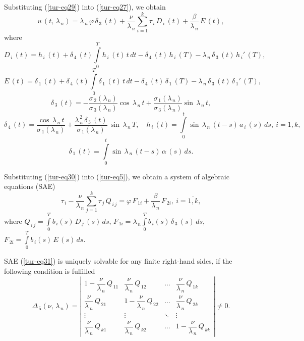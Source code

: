 ﻿\documentclass[
11pt,%
tightenlines,%
twoside,%
onecolumn,%
nofloats,%
nobibnotes,%
nofootinbib,%
superscriptaddress,%
noshowpacs,%
centertags]%
{revtex4}
\begin{document}
 Substituting (\ref{tur-eq29}) into (\ref{tur-eq27}), we obtain
\begin{equation} \label{tur-eq30}	
u \, (t , \, \lambda_{\, n})=\lambda_{\, n}  \, \varphi \, \delta_{\, 3} \, (t)+\dfrac{\nu}{\lambda_{\, n}} \sum \limits_{i=1}^{k} \tau_{\, i} \, D_{\, i} \, (t)+\dfrac{\beta}{\lambda_{\, n}} \, E \, (t) ,
\end{equation}
where 
\[
D_{\, i} \, (t)=h_{ \, i} \, (t)+\delta_{ \, 4} \, (t) \int \limits_{0}^T h_{ \, i} \, (t) \, t \, d t-\delta_{ \, 4} \, (t) \, h_{ \, i} \, (T)-\lambda_{\, n} \, \delta_{ \, 3} \, (t) \, h_{\, i} ' \, (T) ,
\]
\[
E \, (t)=\delta_{ \, 1} \, (t)+\delta_{ \, 4} \, (t) \int \limits_{0}^T \delta_{ \, 1} \, (t) \, t \, d t-\delta_{ \, 4} \, (t) \, \delta_{ \, 1} \, (T)-\lambda_{\, n} \, \delta_{ \, 3} \, (t) \, \delta_{\, 1} ' \, (T) ,
\]
\[
\delta_{ \, 3} \, (t)=-\dfrac{\sigma_{\, 2} (\lambda_{\, n})}{\sigma_{\, 3} (\lambda_{\, n})} \cos \, \lambda_{\, n} \, t+\dfrac{\sigma_{\, 1} (\lambda_{\, n})}{\sigma_{\, 3} (\lambda_{\, n})} \sin \, \lambda_{\, n} \, t ,
\]
\[
\delta_{ \, 4} \, (t)=\dfrac{\cos \, \lambda_{\, n} \, t}{\sigma_{\, 1 } (\lambda_{\, n})}+\dfrac{\lambda_{\, n}^{\, 2} \, \delta_{\, 3 } \, (t)}{\sigma_{\, 1 } (\lambda_{\, n})} \, \sin \, \lambda_{\, n} \, T , \quad  h_{\, i } \, (t)= \int \limits_{0}^t \sin \, \lambda_{\, n} \, (t-s) \, a_{\, i} \, (s) \, d s , \: i=\overline{1 , k} ,
\]
\[
\delta_{\, 1 } \, (t)= \int \limits_{0}^t \sin \, \lambda_{\, n} \, (t-s) \, \alpha \, (s) \, d s .
\]

	Substituting (\ref{tur-eq30}) into (\ref{tur-eq5}), we obtain a system of algebraic equations (SAE)
\begin{equation} \label{tur-eq31}	
\tau_{\, i}-\dfrac{\nu}{\lambda_{\, n}} \sum \limits_{j=1}^{k} \tau_{\, j} \, Q_{\, i \, j}=\varphi \, 
F_{\, 1 i}+\dfrac{\beta}{\lambda_{\, n}} \, F_{\, 2 i} , \: i=\overline{1 , k} ,
\end{equation}
where $Q_{\, i \, j}=\int \limits_{0}^{T} b_{\, i} (s) \, D_{\, j} \, (s) \, d s$,
$F_{\, 1 i}=\lambda_{\, n} \int \limits_{0}^{T}  b_{\, i} (s) \, \delta_{\, 3} \, (s) \, d s $,
$F_{\, 2 i}= \int \limits_{0}^{T}  b_{\, i} (s) \, E \, (s) \, d s $.
     
	SAE (\ref{tur-eq31}) is uniquely solvable for any finite right-hand sides,  if the following condition is fulfilled 
\begin {equation}\label{tur-eq32}
\Delta_{\, 5} (\nu , \, \lambda_{\, n})=\left| \begin{array}{cccc}
1-\dfrac{\nu}{\lambda_{\, n}} \, Q_{\, 11 } & \dfrac{\nu}{\lambda_{\, n}} \, Q_{\, 12 }& \ldots & \dfrac{\nu}{\lambda_{\, n}} \, Q_{\, 1 k } \\
\dfrac{\nu}{\lambda_{\, n}} \, Q_{\, 21 } & 1-\dfrac{\nu}{\lambda_{\, n}} \, Q_{\, 22 } &  \ldots & \dfrac{\nu}{\lambda_{\, n}} \, Q_{\, 2 k } \\
\vdots &  \vdots &  \ddots & \vdots \\
\dfrac{\nu}{\lambda_{\, n}} \, Q_{\, k 1 } & \dfrac{\nu}{\lambda_{\, n}} \, Q_{\, k 2 } &   \ldots  & 1-\dfrac{\nu}{\lambda_{\, n}} \, Q_{\, k k }
\end{array} \right| \ne 0 .
\end{equation}	
    
\end{document}
